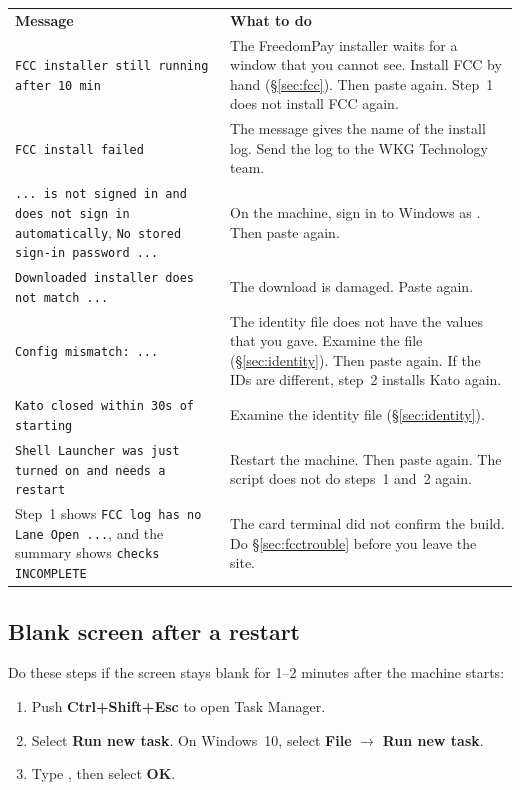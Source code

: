 \documentclass[a4paper,10pt]{article}
\begin{document}
\begin{center}
\renewcommand{\arraystretch}{1.35}\small
\begin{tabularx}{\textwidth}{L{62mm} X}
\color{white}\textbf{Message} &
\color{white}\textbf{What to do}\\
\texttt{FCC installer still running after 10 min} &
The FreedomPay installer waits for a window that you cannot see. Install
FCC by hand (\S\ref{sec:fcc}). Then paste again. Step~1 does not install
FCC again.\\
\texttt{FCC install failed} &
The message gives the name of the install log. Send the log to the WKG
Technology team.\\
\texttt{... is not signed in and does not sign in automatically},
\texttt{No stored sign-in password ...} &
On the machine, sign in to Windows as . Then paste
again.\\
\texttt{Downloaded installer does not match ...} &
The download is damaged. Paste again.\\
\texttt{Config mismatch: ...} &
The identity file does not have the values that you gave. Examine the file
(\S\ref{sec:identity}). Then paste again. If the IDs are different, step~2
installs Kato again.\\
\texttt{Kato closed within 30s of starting} &
Examine the identity file (\S\ref{sec:identity}).\\
\texttt{Shell Launcher was just turned on and needs a restart} &
Restart the machine. Then paste again. The script does not do steps~1
and~2 again.\\
Step~1 shows \texttt{FCC log has no Lane Open ...}, and the summary shows
\texttt{checks INCOMPLETE} &
The card terminal did not confirm the build. Do \S\ref{sec:fcctrouble}
before you leave the site.\\
\end{tabularx}
\end{center}

\subsection{Blank screen after a restart}\label{sec:blank}

Do these steps if the screen stays blank for 1--2 minutes after the
machine starts:

\begin{enumerate}
  \item Push \textbf{Ctrl+Shift+Esc} to open Task Manager.
  \item Select \textbf{Run new task}. On Windows~10, select
        \textbf{File} $\rightarrow$ \textbf{Run new task}.
  \item Type , then select \textbf{OK}.
\end{enumerate}
\end{document}
